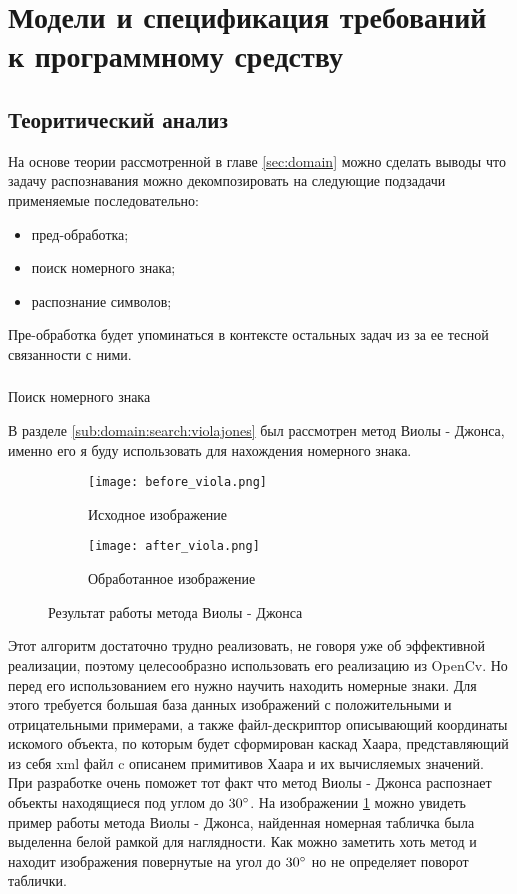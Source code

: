 \section{Модели и спецификация требований к программному средству}
\label{sec:funcreq}

\subsection{Теоритический анализ}
\label{sec:funcreq:teoretical_anolisys}

На основе теории рассмотренной в главе \ref{sec:domain} можно сделать выводы что задачу распознавания можно декомпозировать на следующие подзадачи применяемые последовательно:
\begin{itemize}
	\item пред-обработка;
	\item поиск номерного знака;
	\item распознание символов;
\end{itemize} 

Пре-обработка будет упоминаться в контексте остальных задач из за ее тесной связанности с ними.

\subsubsection{}
\label{seq:funcreq:analisys}
Поиск номерного знака

В разделе \ref{sub:domain:search:violajones} был рассмотрен метод Виолы - Джонса, именно его я буду использовать для нахождения номерного знака. 
\begin{figure}[ht]
\centering
  \begin{subfigure}[b]{0.48\textwidth} 
    \centering
    \texttt{[image: before\_viola.png]}  
    \caption{Исходное изображение}
  \end{subfigure}
  \begin{subfigure}[b]{0.48\textwidth} 
    \centering
    \texttt{[image: after\_viola.png]}  
    \caption{Обработанное изображение}
  \end{subfigure}
  \caption{Результат работы метода Виолы - Джонса}
  \label{fig:funcreq:analisys:viola}
\end{figure}
Этот алгоритм достаточно трудно реализовать, не говоря уже об эффективной реализации, поэтому целесообразно использовать его реализацию из OpenCv. Но перед его использованием его нужно научить находить номерные знаки. Для этого требуется большая база данных изображений с положительными и отрицательными примерами, а также файл-дескриптор описывающий координаты искомого объекта, по которым будет сформирован каскад Хаара, представляющий из себя xml файл c описанем примитивов Хаара и их вычисляемых значений. При разработке очень поможет тот факт что метод Виолы - Джонса распознает объекты находящиеся под углом до $30\degree$. На изображении \ref{fig:funcreq:analisys:viola} можно увидеть пример работы метода Виолы - Джонса, найденная номерная табличка была выделенна белой рамкой для наглядности. Как можно заметить хоть метод и находит изображения повернутые на угол до $30\degree$ но не определяет поворот таблички. 

